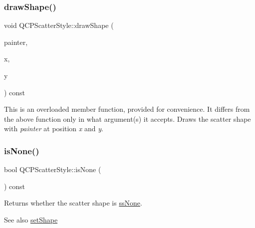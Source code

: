 \subsubsection{\texorpdfstring{draw\+Shape()}{drawShape()}\hspace{0.1cm}{\footnotesize\ttfamily [2/2]}}
{\footnotesize\ttfamily void Q\+C\+P\+Scatter\+Style\+::draw\+Shape (\begin{DoxyParamCaption}\item[{\mbox{\hyperlink{class_q_c_p_painter}{Q\+C\+P\+Painter}} $\ast$}]{painter,  }\item[{double}]{x,  }\item[{double}]{y }\end{DoxyParamCaption}) const}

This is an overloaded member function, provided for convenience. It differs from the above function only in what argument(s) it accepts. Draws the scatter shape with {\itshape painter} at position {\itshape x} and {\itshape y}. \mbox{\label{class_q_c_p_scatter_style_a72db6bcb1e1abd6e53c1315dd3dea7e4}} 
\subsubsection{\texorpdfstring{is\+None()}{isNone()}}
{\footnotesize\ttfamily bool Q\+C\+P\+Scatter\+Style\+::is\+None (\begin{DoxyParamCaption}{ }\end{DoxyParamCaption}) const\hspace{0.3cm}{\ttfamily [inline]}}

Returns whether the scatter shape is \mbox{\hyperlink{class_q_c_p_scatter_style_adb31525af6b680e6f1b7472e43859349abd144c291ca274f77053ec68cab6c022}{ss\+None}}.

\begin{DoxySeeAlso}{See also}
\mbox{\hyperlink{class_q_c_p_scatter_style_a7c641c4d4c6d29cb705d3887cfce91c1}{set\+Shape}} 
\end{DoxySeeAlso}
\mbox{\label{class_q_c_p_scatter_style_a47077eb6450fe9a788f833e4ec1b1d5a}} 
